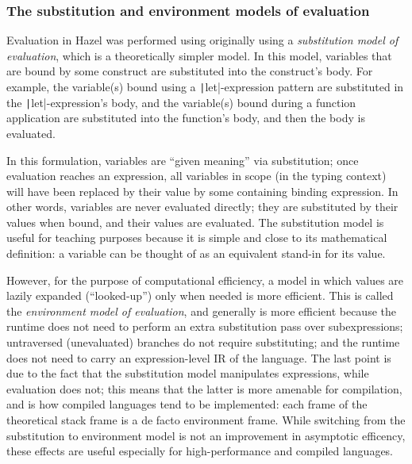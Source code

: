 \subsubsection{The substitution and environment models of evaluation}
\label{sec:sub-vs-eval}


Evaluation in Hazel was performed using originally using a \textit{substitution model of evaluation}, which is a theoretically simpler model. In this model, variables that are bound by some construct are substituted into the construct's body. For example, the variable(s) bound using a \texttt|let|-expression pattern are substituted in the \texttt|let|-expression's body, and the variable(s) bound during a function application are substituted into the function's body, and then the body is evaluated.


In this formulation, variables are ``given meaning'' via substitution; once evaluation reaches an expression, all variables in scope (in the typing context) will have been replaced by their value by some containing binding expression. In other words, variables are never evaluated directly; they are substituted by their values when bound, and their values are evaluated. The substitution model is useful for teaching purposes because it is simple and close to its mathematical definition: a variable can be thought of as an equivalent stand-in for its value.

However, for the purpose of computational efficiency, a model in which values are lazily expanded (``looked-up'') only when needed is more efficient. This is called the \textit{environment model of evaluation}, and generally is more efficient because the runtime does not need to perform an extra substitution pass over subexpressions; untraversed (unevaluated) branches do not require substituting; and the runtime does not need to carry an expression-level IR of the language. The last point is due to the fact that the substitution model manipulates expressions, while evaluation does not; this means that the latter is more amenable for compilation, and is how compiled languages tend to be implemented: each frame of the theoretical stack frame is a de facto environment frame. While switching from the substitution to environment model is not an improvement in asymptotic efficency, these effects are useful especially for high-performance and compiled languages.

